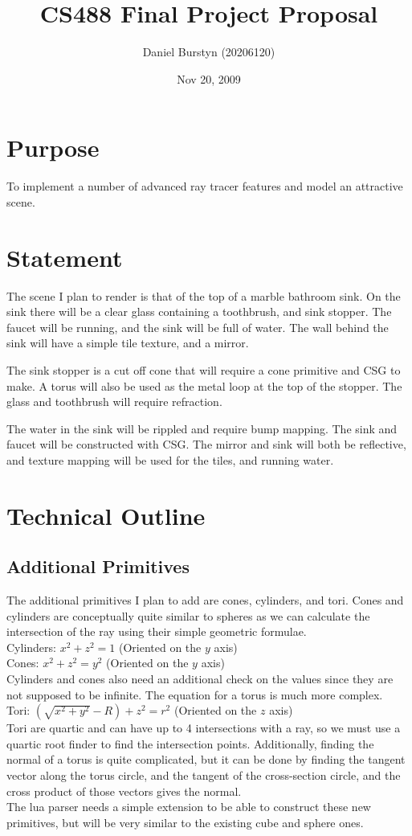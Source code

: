 \documentclass {article}
\title{CS488 Final Project Proposal}
\author{Daniel Burstyn (20206120)}
\date{Nov 20, 2009}
\begin{document}
\maketitle
\newpage

\section{Purpose}
To implement a number of advanced ray tracer features and model an attractive
scene.

\section{Statement}
The scene I plan to render is that of the top of a marble bathroom sink.  On the
sink there will be a clear glass containing a toothbrush, and sink stopper.
The faucet will be running, and the sink will be full of water.  The wall behind
the sink will have a simple tile texture, and a mirror.

The sink stopper is a cut off cone that will require a cone primitive and CSG to
make.  A torus will also be used as the metal loop at the top of the stopper.
The glass and toothbrush will require refraction.

The water in the sink will be rippled and require bump mapping.  The sink and
faucet will be constructed with CSG.  The mirror and sink will both be
reflective, and texture mapping will be used for the tiles, and running water.

\section{Technical Outline}
\subsection{Additional Primitives}
The additional primitives I plan to add are cones, cylinders, and tori.  Cones
and cylinders are conceptually quite similar to spheres as we can calculate the
intersection of the ray using their simple geometric formulae.\\
Cylinders: $x^2 + z^2 = 1$ (Oriented on the $y$ axis)\\
Cones: $x^2 + z^2 = y^2$ (Oriented on the $y$ axis)\\
Cylinders and cones also need an additional check on the values since they are
not supposed to be infinite.  The equation for a torus is much more complex.\\
Tori: $(\sqrt{x^2 + y^2} - R) + z^2 = r^2$ (Oriented on the $z$ axis)\\
Tori are quartic and can have up to 4 intersections with a ray, so we must use a
quartic root finder to find the intersection points.  Additionally, finding the
normal of a torus is quite complicated, but it can be done by finding the
tangent vector along the torus circle, and the tangent of the cross-section
circle, and the cross product of those vectors gives the normal.\\
The lua parser needs a simple extension to be able to construct these new
primitives, but will be very similar to the existing cube and sphere ones.
\end{document}
